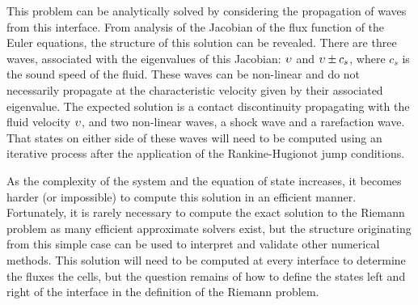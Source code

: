 
This problem can be analytically solved by considering the propagation of waves from this interface.
From analysis of the Jacobian of the flux function of the Euler equations, the structure of this solution can be revealed.
There are three waves, associated with the eigenvalues of this Jacobian: $\upsilon$ and $\upsilon\pm c_s$, where $c_s$ is the sound speed of the fluid.
These waves can be non-linear and do not necessarily propagate at the characteristic velocity given by their associated eigenvalue.
The expected solution is a contact discontinuity propagating with the fluid velocity $\upsilon$, and two non-linear waves, a shock wave and a rarefaction wave.
That states on either side of these waves will need to be computed using an iterative process after the application of the Rankine-Hugionot jump conditions.

As the complexity of the system and the equation of state increases, it becomes harder (or impossible) to compute this solution in an efficient manner.
Fortunately, it is rarely necessary to compute the exact solution to the Riemann problem as many efficient approximate solvers exist, but the structure originating from this simple case can be used to interpret and validate other numerical methods.
This solution will need to be computed at every interface to determine the fluxes the cells, but the question remains of how to define the states left and right of the interface in the definition of the Riemann problem.

